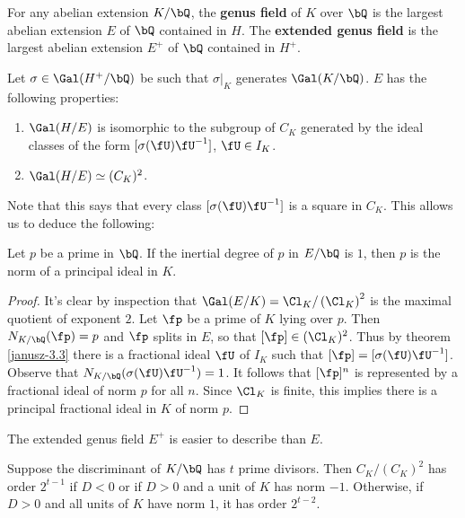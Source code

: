 \begin{defn}
    For any abelian extension $K / \bQ$, the \textbf{genus field} of $K$ over $\bQ$ is the largest abelian extension $E$ of $\bQ$ contained in $H$. The \textbf{extended genus field } is the largest abelian extension $E^{+}$ of $\bQ $ contained in $H^{+}$.
\end{defn}

Let $\sigma \in \Gal(H^{+} / \bQ)$ be such that $\sigma|_{K}$ generates $\Gal(K / \bQ)$. $E$ has the following properties:

\begin{thm}\cite[Something 3.3]{Janusz} \label{janusz-3.3}
    \begin{enumerate}
        \item $\Gal(H / E)$ is isomorphic to the subgroup of $C_K$ generated by the ideal classes of the form $[\sigma(\fU)\fU^{-1}]$, $\fU \in I_K$. 
        \item $\Gal(H / E) \simeq (C_K)^2$. 
    \end{enumerate}
\end{thm}

Note that this says that every class $[\sigma(\fU) \fU^{-1}]$ is a square in $C_K$.
This allows us to deduce the following:

\begin{thm}\label{p-principal}
Let $p$ be a prime in $\bQ$. If the inertial degree of $p$ in $E / \bQ$ is $1$, then $p$ is the norm of a principal ideal in $K$. 
\end{thm} 

\begin{proof}
It's clear by inspection that $\Gal(E / K) = \Cl_K / \left(\Cl_K\right)^2$ is the maximal quotient of exponent $2$. Let $\fp$ be a prime of $K$ lying over $p$. Then $N_{K / \bQ}(\fp) = p$ and $\fp$ splits in $E$, so that $[\fp] \in (\Cl_K)^2$. Thus by theorem \ref{janusz-3.3} there is a fractional ideal $\fU$ of $I_K$ such that 
$[\fp] = [\sigma(\fU)\fU^{-1}]$. Observe that $N_{K / \bQ}(\sigma(\fU)\fU^{-1}) = 1$. It follows that $[\fp]^n$ is represented by a fractional ideal of norm $p$ for all $n$. Since $\Cl_K$ is finite, this implies there is a principal fractional ideal in $K$ of norm $p$. 
\end{proof}

The extended genus field $E^{+}$ is easier to describe than $E$.

\begin{thm} 
Suppose the discriminant of $K / \bQ$ has $t$ prime divisors. Then $C_K / (C_K)^2$ has order $2^{t-1}$ if $D < 0$ or if $D > 0$ and a unit of $K$ has norm $-1$. Otherwise, if $D > 0$ and all units of $K$ have norm $1$, it has order $2^{t - 2}$.
\end{thm} 

